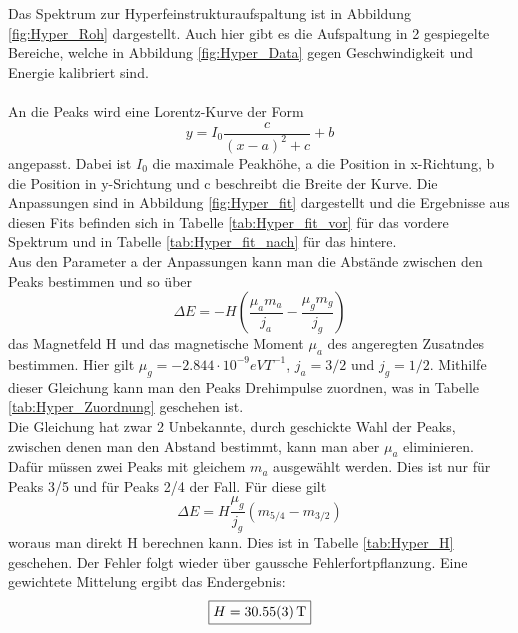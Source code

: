 \documentclass[12pt,a4paper]{article}
\begin{document}
Das Spektrum zur Hyperfeinstrukturaufspaltung ist in Abbildung \ref{fig:Hyper_Roh} dargestellt. Auch hier gibt es die Aufspaltung in 2 gespiegelte Bereiche, welche in Abbildung \ref{fig:Hyper_Data} gegen Geschwindigkeit und Energie kalibriert sind.\\
\\
An die Peaks wird eine Lorentz-Kurve der Form
\begin{equation}
y = I_0 \dfrac{c}{(x-a)^2+c}+b
\end{equation}
angepasst. Dabei ist $I_0$ die maximale Peakhöhe, a die Position in x-Richtung, b die Position in y-Srichtung und c beschreibt die Breite der Kurve.
Die Anpassungen sind in Abbildung \ref{fig:Hyper_fit} dargestellt und die Ergebnisse aus diesen Fits befinden sich in Tabelle \ref{tab:Hyper_fit_vor} für das vordere Spektrum und in Tabelle \ref{tab:Hyper_fit_nach} für das hintere.
\\
Aus den Parameter a der Anpassungen kann man die Abstände zwischen den Peaks bestimmen und so über 
\begin{equation}
\Delta E = -H\left(\dfrac{\mu_a m_a}{j_a}-\dfrac{\mu_g m_g}{j_g}\right)
\label{eq:Hyper}
\end{equation}
das Magnetfeld H und das magnetische Moment $\mu_a$ des angeregten Zusatndes bestimmen. Hier gilt $\mu_g = -2.844\cdot 10^{-9}eVT^{-1}$, $j_a = 3/2$ und $j_g = 1/2$.  Mithilfe dieser Gleichung kann man den Peaks Drehimpulse zuordnen, was in Tabelle \ref{tab:Hyper_Zuordnung} geschehen ist.\\
Die Gleichung hat zwar 2 Unbekannte, durch geschickte Wahl der Peaks, zwischen denen man den Abstand bestimmt, kann man aber $\mu_a$ eliminieren. Dafür müssen zwei Peaks mit gleichem $m_a$ ausgewählt werden. Dies ist nur für Peaks 3/5 und für Peaks 2/4 der Fall. Für diese gilt
\begin{equation}
\Delta E = H\dfrac{\mu_g}{j_g}(m_{5/4}-m_{3/2})
\end{equation}
woraus man direkt H berechnen kann. Dies ist in Tabelle \ref{tab:Hyper_H} geschehen. Der Fehler folgt wieder über gaussche Fehlerfortpflanzung. Eine gewichtete Mittelung ergibt das Endergebnis:
\begin{equation*}
\boxed{H = \SI{30.55\pm 0.03}{T}}
\end{equation*}
\end{document}
